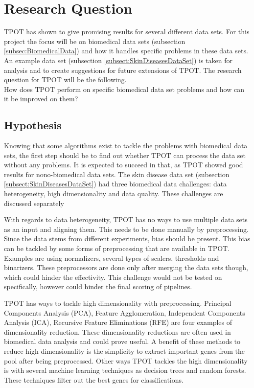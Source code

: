 \documentclass[10pt,a4paper]{article}
\begin{document}
	\section{Research Question}
	\label{sec:ResearchQuestion}
	
	TPOT has shown to give promising results for several different data sets. \cite{Gijsbers2017Thesis} For this project the focus will be on biomedical data sets (subsection \ref{subsec:BiomedicalData}) and how it handles specific problems in these data sets. An example data set (subsection \ref{subsect:SkinDiseasesDataSet}) is taken for analysis and to create suggestions for future extensions of TPOT. The research question for TPOT will be the following.\\
	
	How does TPOT perform on specific biomedical data set problems and how can it be improved on them?\\
	
	\subsection{Hypothesis}
	\label{subsec:Hypothesis}
	
	Knowing that some algorithms exist to tackle the problems with biomedical data sets, the first step should be to find out whether TPOT can process the data set without any problems. It is expected to succeed in that, as TPOT showed good results for nono-biomedical data sets. The skin disease data set (subsection \ref{subsect:SkinDiseasesDataSet}) had three biomedical data challenges: data heterogeneity, high dimensionality and data quality. These challenges are discussed separately

	With regards to data heterogeneity, TPOT has no ways to use multiple data sets as an input and aligning them. This needs to be done manually by preprocessing. Since the data stems from different experiments, bias should be present. This bias can be tackled by some forms of preprocessing that are available in TPOT. Examples are using normalizers, several types of scalers, thresholds and binarizers. These preprocessors are done only after merging the data sets though, which could hinder the effectivity. This challenge would not be tested on specifically, however could hinder the final scoring of pipelines.
	
	TPOT has ways to tackle high dimensionality with preprocessing. Principal Components Analysis (PCA), Feature Agglomeration, Independent Components Analysis (ICA), Recursive Feature Eliminations (RFE) are four examples of dimensionality reduction. These dimensionality reductions are often used in biomedical data analysis and could prove useful. A benefit of these methods to reduce high dimensionality is the simplicity to extract important genes from the pool after being preprocessed. Other ways TPOT tackles the high dimensionality is with several machine learning techniques as decision trees and random forests. These techniques filter out the best genes for classifications.
	
\end{document}
